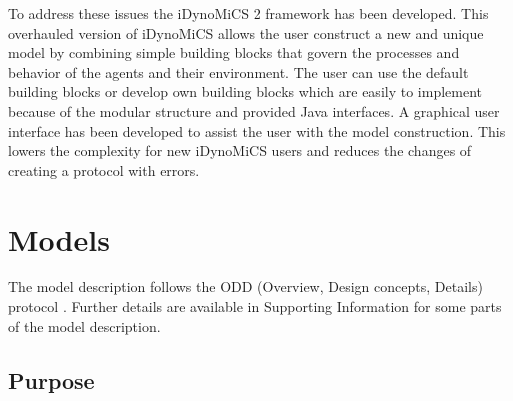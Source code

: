 \documentclass[10pt,letterpaper]{article}
\begin{document}
To address these issues the iDynoMiCS 2 framework has been developed. This overhauled version of iDynoMiCS allows the user construct a new and unique model by combining simple building blocks that govern the processes and behavior of the agents and their environment. The user can use the default building blocks or develop own building blocks which are easily to implement because of the modular structure and provided Java interfaces. A graphical user interface has been developed to assist the user with the model construction. This lowers the complexity for new iDynoMiCS users and reduces the changes of creating a protocol with errors.


\section*{Models}
The model description follows the ODD (Overview, Design concepts, Details) protocol \cite{Grimm2006, Grimm2010}. Further details are available in Supporting Information for some parts of the model description.

\subsection*{Purpose}
\end{document}
